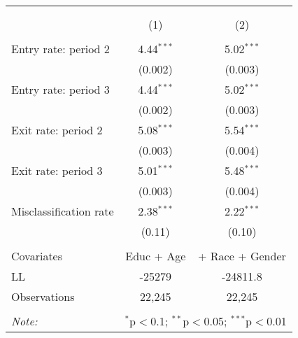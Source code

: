
\begin{table}[!htbp] \centering 
  \caption{} 
  \label{table_covariates_implied} 
\begin{tabular}{@{\extracolsep{5pt}}lcc} 
\\[-1.8ex]\hline 
\hline \\[-1.8ex] 
\\[-1.8ex] & (1) & (2)\\ 
\hline \\[-1.8ex] 
 Entry rate: period 2 & 4.44$^{***}$ & 5.02$^{***}$ \\ 
  & (0.002) & (0.003) \\ 
  Entry rate: period 3 & 4.44$^{***}$ & 5.02$^{***}$ \\ 
  & (0.002) & (0.003) \\ 
  Exit rate: period 2 & 5.08$^{***}$ & 5.54$^{***}$ \\ 
  & (0.003) & (0.004) \\ 
  Exit rate: period 3 & 5.01$^{***}$ & 5.48$^{***}$ \\ 
  & (0.003) & (0.004) \\ 
  Misclassification rate & 2.38$^{***}$ & 2.22$^{***}$ \\ 
  & (0.11) & (0.10) \\ 
 \hline \\[-1.8ex] 
Covariates & Educ + Age & + Race + Gender \\ 
LL & -25279 & -24811.8 \\ 
Observations & 22,245 & 22,245 \\ 
\hline 
\hline \\[-1.8ex] 
\textit{Note:}  & \multicolumn{2}{r}{$^{*}$p$<$0.1; $^{**}$p$<$0.05; $^{***}$p$<$0.01} \\ 
\end{tabular} 
\end{table} 

